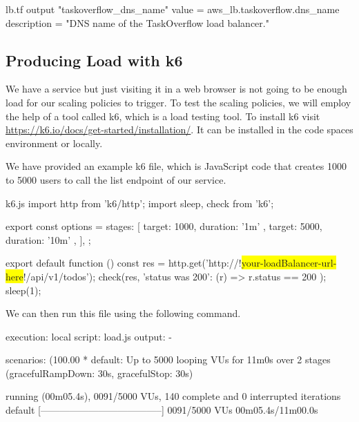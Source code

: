 \documentclass{csse4400}
\begin{document}
\begin{code}[language=terraform,numbers=none,keepspaces=true]{lb.tf}
output "taskoverflow_dns_name" { 
  value = aws_lb.taskoverflow.dns_name
  description = "DNS name of the TaskOverflow load balancer."
}\end{code}


\subsection{Producing Load with k6}\label{k6}

We have a service but just visiting it in a web browser is not going to be enough load for our scaling policies to trigger.
To test the scaling policies, we will employ the help of a tool called k6, which is a load testing tool.
To install k6 visit \url{https://k6.io/docs/get-started/installation/}.
It can be installed in the code spaces environment or locally.

We have provided an example k6 file, which is JavaScript code that creates
1000 to 5000 users to call the list endpoint of our service.

\begin{code}[language=javascript,numbers=none,escapechar=!]{k6.js}
import http from 'k6/http';
import { sleep, check } from 'k6';

export const options = {
  stages: [
    { target: 1000, duration: '1m' },
    { target: 5000, duration: '10m' },
  ],
};

export default function () {
  const res = http.get('http://!\colorbox{yellow}{your-loadBalancer-url-here}!/api/v1/todos');
  check(res, { 'status was 200': (r) => r.status == 200 });
  sleep(1);
}
\end{code}

We can then run this file using the following command.


\begin{code}[language=bash,numbers=none,keepspaces=true]{}
execution: local
  script: load.js
  output: -

scenarios: (100.00%
        * default: Up to 5000 looping VUs for 11m0s over 2 stages (gracefulRampDown: 30s, gracefulStop: 30s)


running (00m05.4s), 0091/5000 VUs, 140 complete and 0 interrupted iterations
default   [--------------------------------------] 0091/5000 VUs  00m05.4s/11m00.0s

\end{code}
\end{document}
